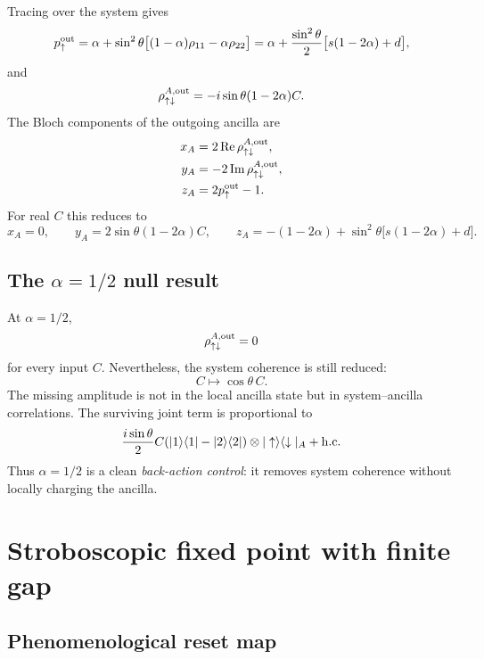 \documentclass[11pt,a4paper]{article}
\newcommand{\ket}[1]{|#1\rangle}
\newcommand{\bra}[1]{\langle #1|}
\newcommand{\proj}[1]{|#1\rangle\langle #1|}
\begin{document}
Tracing over the system gives
\begin{equation}
p_\uparrow^{\rm out}=\alpha+\sin^2\theta\big[(1-\alpha)\rho_{11}-\alpha\rho_{22}\big]
=\alpha+\frac{\sin^2\theta}{2}\big[s(1-2\alpha)+d\big],
\end{equation}
and
\begin{equation}
\rho_{\uparrow\downarrow}^{A,{\rm out}}=-i\sin\theta(1-2\alpha)C.
\end{equation}
The Bloch components of the outgoing ancilla are
\begin{align}
x_A&=2\operatorname{Re}\rho_{\uparrow\downarrow}^{A,{\rm out}},\\
y_A&=-2\operatorname{Im}\rho_{\uparrow\downarrow}^{A,{\rm out}},\\
z_A&=2p_\uparrow^{\rm out}-1.
\end{align}
For real $C$ this reduces to
\begin{equation}
x_A=0,
\qquad
 y_A=2\sin\theta(1-2\alpha)C,
\qquad
 z_A=-(1-2\alpha)+\sin^2\theta\big[s(1-2\alpha)+d\big].
\end{equation}

\subsection{The $\alpha=1/2$ null result}

At $\alpha=1/2$,
\begin{equation}
\rho_{\uparrow\downarrow}^{A,{\rm out}}=0
\end{equation}
for every input $C$. Nevertheless, the system coherence is still reduced:
\begin{equation}
C\mapsto\cos\theta\,C.
\end{equation}
The missing amplitude is not in the local ancilla state but in system--ancilla correlations. The surviving joint term is proportional to
\begin{equation}
\frac{i\sin\theta}{2}C(\proj{1}-\proj{2})\otimes\ket{\uparrow}\bra{\downarrow}_A+{\rm h.c.}
\end{equation}
Thus $\alpha=1/2$ is a clean \emph{back-action control}: it removes system coherence without locally charging the ancilla.

\section{Stroboscopic fixed point with finite gap}

\subsection{Phenomenological reset map}
\end{document}
